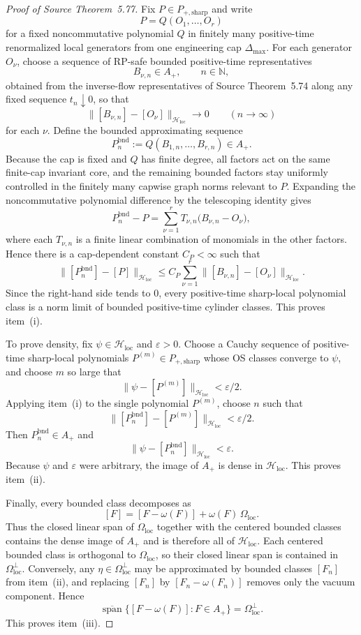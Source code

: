 \begin{proof}[Proof of Source Theorem~5.77]
Fix $P\in P_{+,\mathrm{sharp}}$ and write
\[
P=Q(O_1,\dots,O_r)
\]
for a fixed noncommutative polynomial $Q$ in finitely many positive-time renormalized local generators from one engineering cap $\Delta_{\max}$. For each generator $O_\nu$, choose a sequence of RP-safe bounded positive-time representatives
\[
B_{\nu,n}\in A_+,\qquad n\in\mathbb N,
\]
obtained from the inverse-flow representatives of Source Theorem~5.74 along any fixed sequence $t_n\downarrow 0$, so that
\[
\|[B_{\nu,n}]-[O_\nu]\|_{\mathcal H_{\mathrm{loc}}}\longrightarrow 0\qquad (n\to\infty)
\]
for each $\nu$. Define the bounded approximating sequence
\[
P_n^{\mathrm{bnd}}:=Q(B_{1,n},\dots,B_{r,n})\in A_+.
\]
Because the cap is fixed and $Q$ has finite degree, all factors act on the same finite-cap invariant core, and the remaining bounded factors stay uniformly controlled in the finitely many capwise graph norms relevant to $P$. Expanding the noncommutative polynomial difference by the telescoping identity gives
\[
P_n^{\mathrm{bnd}}-P=\sum_{\nu=1}^r T_{\nu,n}\bigl(B_{\nu,n}-O_\nu\bigr),
\]
where each $T_{\nu,n}$ is a finite linear combination of monomials in the other factors. Hence there is a cap-dependent constant $C_P<\infty$ such that
\[
\|[P_n^{\mathrm{bnd}}]-[P]\|_{\mathcal H_{\mathrm{loc}}}
\le C_P\sum_{\nu=1}^r \|[B_{\nu,n}]-[O_\nu]\|_{\mathcal H_{\mathrm{loc}}}.
\]
Since the right-hand side tends to $0$, every positive-time sharp-local polynomial class is a norm limit of bounded positive-time cylinder classes. This proves item~(i).

To prove density, fix $\psi\in\mathcal H_{\mathrm{loc}}$ and $\varepsilon>0$. Choose a Cauchy sequence of positive-time sharp-local polynomials $P^{(m)}\in P_{+,\mathrm{sharp}}$ whose OS classes converge to $\psi$, and choose $m$ so large that
\[
\|\psi-[P^{(m)}]\|_{\mathcal H_{\mathrm{loc}}}<\varepsilon/2.
\]
Applying item~(i) to the single polynomial $P^{(m)}$, choose $n$ such that
\[
\|[P_n^{\mathrm{bnd}}]-[P^{(m)}]\|_{\mathcal H_{\mathrm{loc}}}<\varepsilon/2.
\]
Then $P_n^{\mathrm{bnd}}\in A_+$ and
\[
\|\psi-[P_n^{\mathrm{bnd}}]\|_{\mathcal H_{\mathrm{loc}}}<\varepsilon.
\]
Because $\psi$ and $\varepsilon$ were arbitrary, the image of $A_+$ is dense in $\mathcal H_{\mathrm{loc}}$. This proves item~(ii).

Finally, every bounded class decomposes as
\[
[F]=[F-\omega(F)] + \omega(F)\,\Omega_{\mathrm{loc}}.
\]
Thus the closed linear span of $\Omega_{\mathrm{loc}}$ together with the centered bounded classes contains the dense image of $A_+$ and is therefore all of $\mathcal H_{\mathrm{loc}}$. Each centered bounded class is orthogonal to $\Omega_{\mathrm{loc}}$, so their closed linear span is contained in $\Omega_{\mathrm{loc}}^{\perp}$. Conversely, any $\eta\in\Omega_{\mathrm{loc}}^{\perp}$ may be approximated by bounded classes $[F_n]$ from item~(ii), and replacing $[F_n]$ by $[F_n-\omega(F_n)]$ removes only the vacuum component. Hence
\[
\overline{\operatorname{span}}\{[F-\omega(F)]:F\in A_+\}=\Omega_{\mathrm{loc}}^{\perp}.
\]
This proves item~(iii).
\end{proof}

